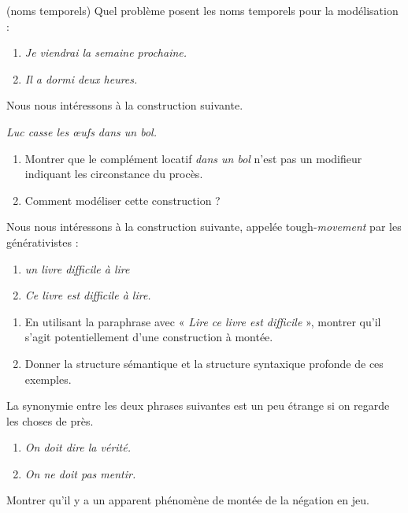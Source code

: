 { (noms temporels) Quel problème posent les noms temporels pour la modélisation :
\begin{enumerate}[label=\alph*.]
\item\textit{Je viendrai la semaine prochaine.}
\item\textit{Il a dormi deux heures.}
\end{enumerate}

 Nous nous intéressons à la construction suivante.
\begin{exe}
\exi{}\textit{Luc casse les œufs dans un bol.}
\end{exe}
\begin{enumerate}
\item Montrer que le complément locatif \textit{dans un bol} n’est pas un modifieur indiquant les circonstance du procès.
\item Comment modéliser cette construction ?
\end{enumerate}

 Nous nous intéressons à la construction suivante, appelée tough-\textit{movement} par les générativistes :
\begin{enumerate}[label=\alph*.]
\item \textit{un livre difficile à lire}
\item\textit{Ce livre est difficile à lire.}
\end{enumerate}
\begin{enumerate}
\item En utilisant la paraphrase avec « \textit{Lire ce livre est difficile} », montrer qu’il s’agit potentiellement d’une construction à montée.
\item Donner la structure sémantique et la structure syntaxique profonde de ces exemples.
\end{enumerate}

 La synonymie entre les deux phrases suivantes est un peu étrange si on regarde les choses de près.
\begin{enumerate}[label=\alph*.]
\item \textit{On doit dire la vérité.}
\item \textit{On ne doit pas mentir.}
\end{enumerate}
Montrer qu’il y a un apparent phénomène de montée de la négation en jeu.}

